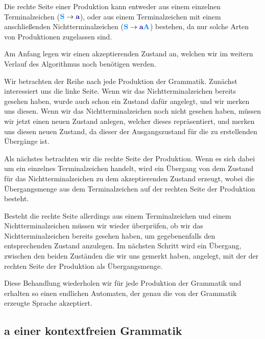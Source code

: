 Die rechte Seite einer Produktion kann entweder aus einem einzelnen
Terminalzeichen ($\NonterminalSymbol{S} \to \TerminalSymbol{a}$), oder
aus einem Terminalzeichen mit einem anschließenden Nichtterminalzeichen
($\NonterminalSymbol{S} \to \TerminalSymbol{a}\NonterminalSymbol{A}$) bestehen,
da nur solche Arten von Produktionen zugelassen sind.\vspace{10pt}

Am Anfang legen wir einen akzeptierenden Zustand an, welchen wir im weitern
Verlauf des Algorithmus noch benötigen werden.\vspace{10pt}

 Wir betrachten der Reihe nach
jede Produktion der Grammatik. Zunächst interessiert uns die linke Seite. Wenn wir das Nichtterminalzeichen
bereits gesehen haben, wurde auch schon ein Zustand dafür angelegt, und wir
merken uns diesen. Wenn wir das Nichtterminalzeichen noch nicht gesehen haben,
müssen wir jetzt einen neuen Zustand anlegen, welcher dieses repräsentiert, und
merken uns diesen neuen Zustand, da dieser der Ausgangszustand
für die zu erstellenden Übergänge ist.\vspace{10pt}

Als nächstes betrachten wir die rechte Seite der Produktion. Wenn es sich dabei
um ein einzelnes Terminalzeichen handelt, wird ein Übergang von dem Zustand für
das Nichtterminalzeichen zu dem akzeptierenden Zustand erzeugt, wobei die
Übergangsmenge aus dem Terminalzeichen auf der rechten Seite der Produktion
besteht.\vspace{10pt}

Besteht die rechte Seite allerdings aus einem Terminalzeichen und einem
Nichtterminalzeichen müssen wir wieder überprüfen, ob wir das
Nichtterminalzeichen bereits gesehen haben, um gegebenenfalls den
entsprechenden Zustand anzulegen. Im nächsten Schritt wird ein Übergang,
zwischen den beiden Zuständen die wir uns gemerkt haben, angelegt, mit der der
rechten Seite der Produktion als Übergangsmenge.\vspace{10pt}

Diese Behandlung wiederholen wir für jede Produktion der Grammatik und
erhalten so einen endlichen Automaten, der genau die von der
Grammatik erzeugte Sprache akzeptiert.\vspace{10pt}

\subsection{a einer kontextfreien
Grammatik}\label{ConverToGrammarContextFree}

